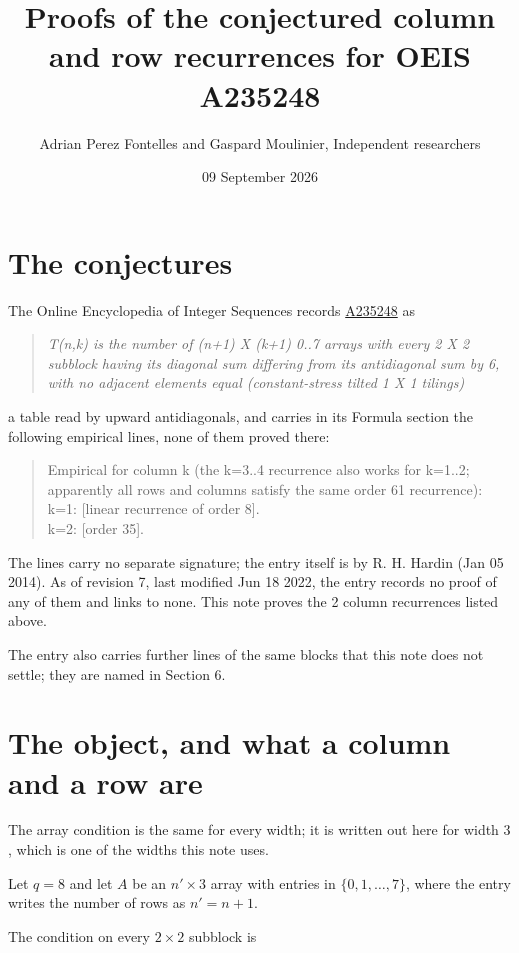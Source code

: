 \documentclass[11pt]{article}
\title{Proofs of the conjectured column and row recurrences for OEIS A235248}
\author{Adrian Perez Fontelles and Gaspard Moulinier, Independent researchers}
\date{09 September 2026}
\theoremstyle{definition}
\begin{document}
\maketitle
\section{The conjectures}

The Online Encyclopedia of Integer Sequences records \href{https://oeis.org/A235248}{A235248} as

\begin{quote}\itshape T(n,k) is the number of (n+1) X (k+1) 0..7 arrays with every 2 X 2 subblock having its diagonal sum differing from its antidiagonal sum by 6, with no adjacent elements equal (constant-stress tilted 1 X 1 tilings)\end{quote}

a table read by upward antidiagonals, and carries in its Formula section the following empirical lines, none of them proved there:

\begin{quote}\ttfamily Empirical for column k (the k=3..4 recurrence also works for k=1..2; apparently all rows and columns satisfy the same order 61 recurrence):\\
k=1: [linear recurrence of order 8].\\k=2: [order 35].\end{quote}

The lines carry no separate signature; the entry itself is by R. H. Hardin (Jan 05 2014). As of revision 7, last modified Jun 18 2022, the entry records no proof of any of them and links to none. This note proves the 2 column recurrences listed above.

The entry also carries further lines of the same blocks that this note does not settle; they are named in Section 6.

\section{The object, and what a column and a row are}

The array condition is the same for every width; it is written out here for width $3$, which is one of the widths this note uses.

Let $q = 8$ and let $A$ be an $n' \times 3$ array with entries in $\{0,1,\dots,7\}$, where the entry writes the number of rows as $n' = n + 1$.

The condition on every $2 \times 2$ subblock is
\end{document}

